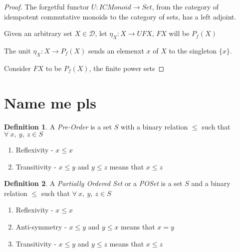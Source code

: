 \documentclass{article}
\theoremstyle{definition}
\newtheorem{definition}{Definition}[section]
\begin{document}
\begin{proof}
	The forgetful functor $U : ICMonoid \rightarrow Set$,
	from the category of idempotent commutative monoids
	to the category of sets,
	has a left adjoint.


	Given an arbitrary set $X \in \mathcal{D}$,
	let $\eta_X : X \rightarrow UFX$,
	$FX$ will be $P_f(X)$


	The unit $\eta_X : X \rightarrow P_f(X)$ sends an elemenxt $x$ of $X$ to the singleton $\{x\}$.


	Consider $FX$ to be $P_f(X)$, the finite power sets





\end{proof}

\section{Name me pls}

\begin{definition}
	A \textit{Pre-Order} is a set $S$ with a binary relation $\leq$ such that
	$\forall\ x,\  y,\  z \in S$
	\begin{enumerate}
		\item Reflexivity - $x \leq x$
		\item Transitivity - $x \leq y$ and $y \leq z$ means that $x \leq z$
	\end{enumerate}
\end{definition}

\begin{definition}
	A \textit{Partially Ordered Set} or a \textit{POSet} is a set $S$ and a binary relation $\leq$ such that
	$\forall\ x,\  y,\  z \in S$
	\begin{enumerate}
		\item Reflexivity - $x \leq x$
		\item Anti-symmetry - $x \leq y$ and $y \leq x$ means that $x = y$
		\item Transitivity - $x \leq y$ and $y \leq z$ means that $x \leq z$
	\end{enumerate}
\end{definition}
\end{document}
